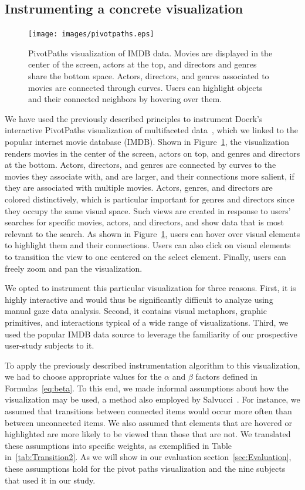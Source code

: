 \subsection{Instrumenting a concrete visualization}

\begin{figure}[htb]
  \centering
  \texttt{[image: images/pivotpaths.eps]}
  \caption{PivotPaths visualization of IMDB data. Movies are displayed in the center of the screen, actors at the top, and directors and genres share the bottom space. Actors, directors, and genres associated to movies are connected through curves. Users can highlight objects and their connected neighbors by hovering over them.}
	\label{fig:pivotpaths}
\end{figure}
We have used the previously described principles to instrument Doerk's interactive PivotPaths visualization of multifaceted data~\cite{dork2012pivotpaths}, which we linked to the popular internet movie database (IMDB). Shown in Figure~\ref{fig:pivotpaths}, the visualization renders movies in the center of the screen, actors on top, and genres and directors at the bottom. Actors, directors, and genres are connected by curves to the movies they associate with, and are larger, and their connections more salient, if they are associated with multiple movies. Actors, genres, and directors are colored distinctively, which is particular important for genres and directors since they occupy the same visual space. Such views are created in response to users' searches for specific movies, actors, and directors, and show data that is most relevant to the search. As shown in Figure~\ref{fig:pivotpaths}, users can hover over visual elements to highlight them and their connections. Users can also click on visual elements to transition the view to one centered on the select element. Finally, users can freely zoom and pan the visualization. 

We opted to instrument this particular visualization for three reasons. First, it is highly interactive and would thus be significantly difficult to analyze using manual gaze data analysis. Second, it contains visual metaphors, graphic primitives, and interactions typical of a wide range of visualizations. Third, we used the popular IMDB data source to leverage the familiarity of our prospective user-study subjects to it.  

To apply the previously described instrumentation algorithm to this visualization, we had to choose appropriate values for the $\alpha$ and $\beta$ factors defined in Formulas~\ref{eq:beta}. To this end, we made informal assumptions about how the visualization may be used, a method also employed by Salvucci~\cite{salvucci2000intelligent}. For instance, we assumed that transitions between connected items would occur more often than between unconnected items. We also assumed that elements that are hovered or highlighted are more likely to be viewed than those that are not. We translated these assumptions into specific weights, as exemplified in Table in~\ref{tab:Transition2}. As we will show in our evaluation section~\ref{sec:Evaluation}, these assumptions hold for the pivot paths visualization and the nine subjects that used it in our study.

